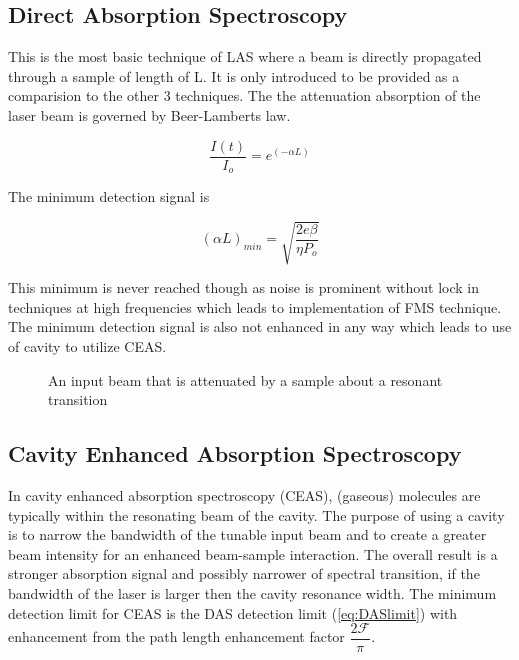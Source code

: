 \documentclass[a4paper]{book}
\newcommand{\imginput}[1]{} %
\begin{document}
\subsection{Direct Absorption Spectroscopy}
\label{subsec:Direct Absorption Spectroscopy}
This is the most basic technique of LAS where a beam is directly propagated through a sample of length of L. It is only introduced to be provided as a comparision to the other 3 techniques. The the attenuation absorption of the laser beam is governed by Beer-Lamberts law.

\begin{equation}
\label{eq:BeerLamberts}
\dfrac{I(t)}{I_o} = e^{(-\alpha L)}
\end{equation}

The minimum detection signal is \cite{NICE-OHMS}

\begin{equation}
\label{eq:DASlimit}
(\alpha L)_{min}=\sqrt{\dfrac{2e\beta}{\eta P_o}}
\end{equation}

This minimum is never reached though as noise is prominent without lock in techniques at high frequencies which leads to implementation of FMS technique. The minimum detection signal is also not enhanced in any way which leads to use of cavity to utilize CEAS. 

\begin{figure} [!ht]
	\centering
	\def\svgwidth{\columnwidth}
	\resizebox{150mm}{!}{\imginput{images/dir-abs-spec.pdf_tex}}
	\label{fig:dir-abs-spec}
	\caption{An input beam that is attenuated by a sample about a resonant transition}
\end{figure}		

\subsection{Cavity Enhanced Absorption Spectroscopy}
\label{subsec:Cavity Enhanced Absorption Spectroscopy}
In cavity enhanced absorption spectroscopy (CEAS), (gaseous) molecules are typically within the resonating beam of the cavity.
The purpose of using a cavity is to narrow the bandwidth of the tunable input beam and to create a greater beam intensity for an enhanced beam-sample interaction. The overall result is a stronger absorption signal and possibly narrower of spectral transition, if the bandwidth of the laser is larger then the cavity resonance width. The minimum detection limit for CEAS is the DAS detection limit (\ref{eq:DASlimit}) with enhancement from the path length enhancement factor $\dfrac{2\mathcal{F}}{\pi}$.
\end{document}
